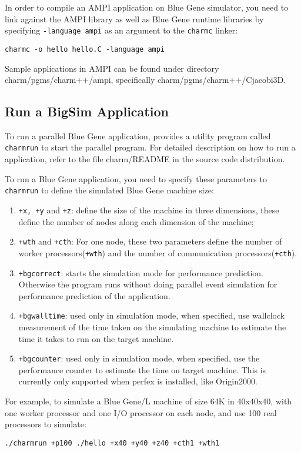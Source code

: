 In order to compile an AMPI application on Blue Gene simulator, you need 
to link against the AMPI library as well as Blue Gene \charmpp{} runtime
libraries by specifying \texttt{-language ampi} as an argument to 
the {\tt charmc} linker:
\begin{verbatim}
charmc -o hello hello.C -language ampi
\end{verbatim}

Sample applications in AMPI can be found under directory
charm/pgms/charm++/ampi, specifically charm/pgms/charm++/Cjacobi3D.

\subsection{Run a BigSim Application}

To run a parallel Blue Gene application, \charmpp{} provides a utility program
called {\tt charmrun} to start the parallel program. 
For detailed description on how to run a \charmpp{} application, 
refer to the file charm/README in the source code distribution.

To run a Blue Gene application, you need to specify these parameters to 
{\tt charmrun} to define the simulated Blue Gene machine size:
\begin{enumerate}
\item {\tt +x, +y} and {\tt +z}:  define the size of the machine in three dimensions, these define the number of nodes along each dimension of the machine;
\item {\tt +wth} and {\tt +cth}:  For one node, these two parameters define the number of worker processors({\tt +wth}) and the number of communication processors({\tt +cth}).
\item {\tt +bgcorrect}: starts the simulation mode for performance prediction. Otherwise the program runs without doing parallel event simulation for performance prediction of the application.
\item {\tt +bgwalltime}: used only in simulation mode, when specified, use wallclock measurement of the time taken on the simulating machine to estimate the time it takes to run on the target machine.
\item {\tt +bgcounter}:  used only in simulation mode, when specified, use the performance counter to estimate the time on target machine. This is currently only supported when perfex is installed, like Origin2000.
\end{enumerate}

For example, to simulate a Blue Gene/L machine of size 64K in 40x40x40, with 
one worker processor and one I/O processor on each node, and use 100 
real processors to simulate:
\begin{verbatim}
./charmrun +p100 ./hello +x40 +y40 +z40 +cth1 +wth1
\end{verbatim}

